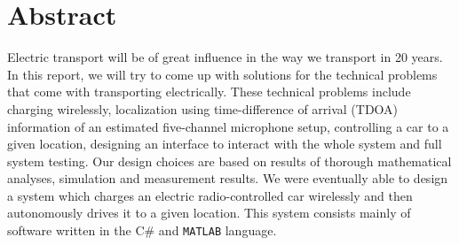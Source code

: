 \documentclass[11pt,titlepage]{report}
\begin{document}
\section*{Abstract}

Electric transport will be of great influence in the way we transport in 20 years. In this report, we will try to come up with solutions for the technical problems that come with transporting electrically. These technical problems include charging wirelessly, localization using time-difference of arrival (TDOA) information of an estimated five-channel microphone setup, controlling a car to a given location, designing an interface to interact with the whole system and full system testing. Our design choices are based on results of thorough mathematical analyses, simulation and measurement results. We were eventually able to design a system which charges an electric radio-controlled car wirelessly and then autonomously drives it to a given location. This system consists mainly of software written in the C\# and \texttt{MATLAB} language.
\end{document}
